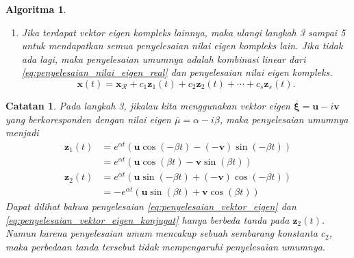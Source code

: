 \documentclass[a4paper]{article}
\theoremstyle{definisi}
\newtheorem{algoritma}{Algoritma}[section]
\newtheorem{catatan}{Catatan}[section]
\newcommand{\bfxi}{\boldsymbol{\xi}}
\numberwithin{equation}{section}
\begin{document}
\begin{algoritma}
\begin{enumerate}[label=Langkah \arabic*: ,leftmargin=*]
\begin{equation}
      \begin{split}
        \mathbf{z}_1(t) &= e^{\alpha t}(\mathbf{u}\cos(\beta t) - \mathbf{v}\sin(\beta t))\\
        \mathbf{z}_2(t) &= e^{\alpha t}(\mathbf{u}\sin(\beta t) + \mathbf{v}\cos(\beta t))
      \end{split}
    \end{equation}
    Dimana sudah merupakan penyelesaian dari pasangan nilai eigen $r$ dan $\overline{r}$ sesuai dengan Teorema \ref{thm:penyelesaian_nilai_eigen_kompleks}.
    \item Jika terdapat vektor eigen kompleks lainnya, maka ulangi langkah 3 sampai 5 untuk mendapatkan semua penyelesaian nilai eigen kompleks lain. Jika tidak ada lagi, maka penyelesaian umumnya adalah kombinasi linear dari \eqref{eq:penyelesaian_nilai_eigen_real} dan penyelesaian nilai eigen kompleks.
    \begin{equation}
      \mathbf{x}(t) = \mathbf{x}_\mathcal{R}+ c_1\mathbf{z}_1(t) + c_2\mathbf{z}_2(t) + \cdots + c_s\mathbf{z}_s(t).
    \end{equation}
  \end{enumerate}
  \end{algoritma}

  \begin{catatan}
    Pada langkah 3, jikalau kita menggunakan vektor eigen $\overline{\bfxi}=\mathbf{u}-i\mathbf{v}$ yang berkoresponden dengan nilai eigen $\overline{\mu} = \alpha - i\beta$, maka penyelesaian umumnya menjadi
    \begin{equation}\label{eq:penyelesaian_vektor_eigen_konjugat}
      \begin{split}
        \mathbf{z}_1(t) &= e^{\alpha t}(\mathbf{u}\cos(-\beta t) - (-\mathbf{v})\sin(-\beta t))\\
        &= e^{\alpha t}(\mathbf{u}\cos(\beta t) - \mathbf{v}\sin(\beta t))\\
        \mathbf{z}_2(t) &= e^{\alpha t}(\mathbf{u}\sin(-\beta t) + (-\mathbf{v})\cos(-\beta t))\\
        &= -e^{\alpha t}(\mathbf{u}\sin(\beta t) + \mathbf{v}\cos(\beta t))
      \end{split}
    \end{equation}
    Dapat dilihat bahwa penyelesaian \eqref{eq:penyelesaian_vektor_eigen} dan \eqref{eq:penyelesaian_vektor_eigen_konjugat} hanya berbeda tanda pada $\mathbf{z}_2(t)$. Namun karena penyelesaian umum mencakup sebuah sembarang konstanta $c_2$, maka perbedaan tanda tersebut tidak mempengaruhi penyelesaian umumnya.
  \end{catatan}
\end{document}
